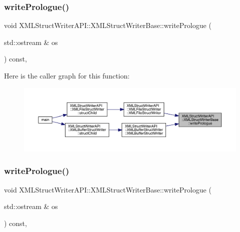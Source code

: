 \subsubsection{\texorpdfstring{writePrologue()}{writePrologue()}\hspace{0.1cm}{\footnotesize\ttfamily [1/2]}}
{\footnotesize\ttfamily void X\+M\+L\+Struct\+Writer\+A\+P\+I\+::\+X\+M\+L\+Struct\+Writer\+Base\+::write\+Prologue (\begin{DoxyParamCaption}\item[{std\+::ostream \&}]{os }\end{DoxyParamCaption}) const\hspace{0.3cm}{\ttfamily [inline]}, {\ttfamily [protected]}}

Here is the caller graph for this function\+:\nopagebreak
\begin{figure}[H]
\begin{center}
\leavevmode
\includegraphics[width=350pt]{db/d4f/classXMLStructWriterAPI_1_1XMLStructWriterBase_a7b8ba2adefb35aa0a0588869b7cca47e_icgraph}
\end{center}
\end{figure}
\mbox{\label{classXMLStructWriterAPI_1_1XMLStructWriterBase_a7b8ba2adefb35aa0a0588869b7cca47e}} 
\subsubsection{\texorpdfstring{writePrologue()}{writePrologue()}\hspace{0.1cm}{\footnotesize\ttfamily [2/2]}}
{\footnotesize\ttfamily void X\+M\+L\+Struct\+Writer\+A\+P\+I\+::\+X\+M\+L\+Struct\+Writer\+Base\+::write\+Prologue (\begin{DoxyParamCaption}\item[{std\+::ostream \&}]{os }\end{DoxyParamCaption}) const\hspace{0.3cm}{\ttfamily [inline]}, {\ttfamily [protected]}}

